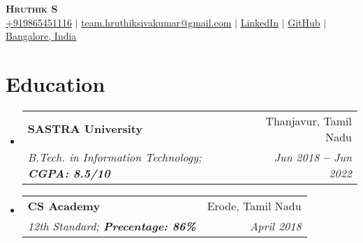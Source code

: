 \documentclass[letterpaper,11pt]{article}
\makeatletter
\newcommand{\resumeSubheading}[4]{
  \vspace{-2pt}\item
    \begin{tabular*}{0.97\textwidth}[t]{l@{\extracolsep{\fill}}r}
      \textbf{#1} & #2 \\
      \textit{\small#3} & \textit{\small #4} \\
    \end{tabular*}\vspace{-7pt}
}
\newcommand{\resumeSubHeadingListStart}{\begin{itemize}[leftmargin=0.15in, label={}]}
\newcommand{\resumeSubHeadingListEnd}{\end{itemize}}
\makeatother
\begin{document}

\begin{center}
    \textbf{\Huge \scshape Hruthik S} \\ \vspace{3pt}
    \small
    \faMobile \hspace{.5pt} \href{tel:+919865451116}{+919865451116}
    $|$
    \faAt \hspace{.5pt} \href{mailto:team.hruthiksivakumar@gmail.com}{team.hruthiksivakumar@gmail.com}
    $|$
    \faLinkedinSquare \hspace{.5pt} \href{https://www.linkedin.com/in/hruthiksivakumar/}{LinkedIn}
    $|$
    \faGithub \hspace{.5pt} \href{https://github.com/hruthiksiva}{GitHub}
    $|$
    \faMapMarker \hspace{.5pt} \href{https://www.google.com/maps/place/Bogazici+University+North+Campus/@41.0863067,29.0441352,15z/data=!4m5!3m4!1s0x0:0x9d2497b07c8edb2f!8m2!3d41.0863067!4d29.0441352}{Bangalore, India}
\end{center}




\section{Education}
  \vspace{3pt}
  \resumeSubHeadingListStart
    
    \resumeSubheading
      {SASTRA University
      }{Thanjavur, Tamil Nadu}
      {B.Tech. in Information Technology;   \textbf{CGPA: 8.5/10}}{Jun 2018 \textbf{--} Jun 2022}


    \resumeSubheading
    {CS Academy
      }{Erode, Tamil Nadu}
      {12th Standard;   \textbf{Precentage: 86\%}} { April 2018 }
      
      
      
    
  \resumeSubHeadingListEnd



\end{document}

